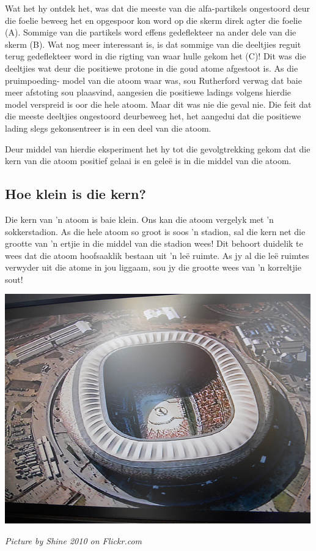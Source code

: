 Wat het hy ontdek het, was dat die meeste van die alfa-partikels ongestoord deur die foelie beweeg het en opgespoor kon word op die skerm direk agter die foelie (A). Sommige van die partikels word effens gedeflekteer na ander dele van die skerm (B). Wat nog meer interessant is, is dat sommige van die deeltjies reguit terug gedeflekteer word in die rigting van waar hulle gekom het (C)! Dit was die deeltjies wat deur die positiewe protone in die goud atome afgestoot is. As die pruimpoeding- model van die atoom waar was, sou Rutherford verwag dat baie meer afstoting sou plaasvind, aangesien die positiewe ladings volgens hierdie model verspreid is oor die hele atoom. Maar dit was nie die geval nie. Die feit dat die meeste deeltjies ongestoord deurbeweeg het, het aangedui dat die positiewe lading slegs gekonsentreer is in een deel van die atoom.\par 

Deur middel van hierdie eksperiment het hy tot die gevolgtrekking gekom dat die kern van die atoom positief gelaai is en gele\"{e} is in die middel van die atoom.
\subsection*{Hoe klein is die kern?}
\begin{minipage}{.5\textwidth}
Die kern van  'n atoom is baie klein. Ons kan die atoom vergelyk met  'n sokkerstadion. As die hele atoom so groot is soos  'n stadion, sal die kern net die grootte van  'n ertjie in die middel van die stadion wees! Dit behoort duidelik te wees dat die atoom hoofsaaklik bestaan uit   'n leë ruimte. As jy al die leë ruimtes verwyder uit die atome in jou liggaam, sou jy die grootte wees van  'n korreltjie sout!
\end{minipage}
\begin{minipage}{.5\textwidth}
\begin{center}
 \includegraphics[width=.4\textwidth]{photos/stadiumby-shine2010-flickr.jpg}\par
\textit{Picture by Shine 2010 on Flickr.com}
\end{center}
\end{minipage}
      
